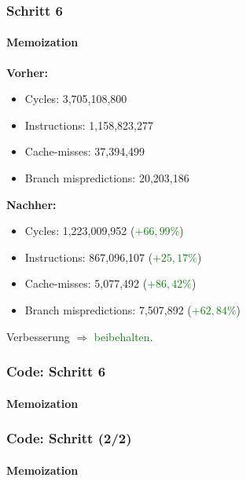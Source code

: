 \documentclass{beamer}
\newcommand{\success}[1]{\textcolor{green}{#1}}
\begin{document}
  \begin{frame}
  	\frametitle{Schritt 6}
  	\framesubtitle{Memoization}
  	\textbf{Vorher:}
		\begin{itemize}
			\item Cycles: 3,705,108,800 \\
			\item Instructions: 1,158,823,277\\
			\item Cache-misses: 37,394,499\\
			\item Branch mispredictions: 20,203,186\\
		\end{itemize}

		\textbf{Nachher:}
		\begin{itemize}
			\item Cycles: 1,223,009,952 (\success{$+ 66,99\%$})\\
			\item Instructions: 867,096,107 (\success{$+ 25,17\%$})\\
			\item Cache-misses: 5,077,492 (\success{$+ 86,42\%$})\\
			\item Branch mispredictions: 7,507,892 (\success{$+ 62,84\%$})\\
		\end{itemize}
		Verbesserung $\Rightarrow$ \success{beibehalten}.
  \end{frame}

  \begin{frame}
  	\frametitle{Code: Schritt 6}
  	\framesubtitle{Memoization}
		\sMemo
  \end{frame}

  \begin{frame}
  	\frametitle{Code: Schritt (2/2)}
  	\framesubtitle{Memoization}
  	\sMemoMain
  \end{frame}
\end{document}
